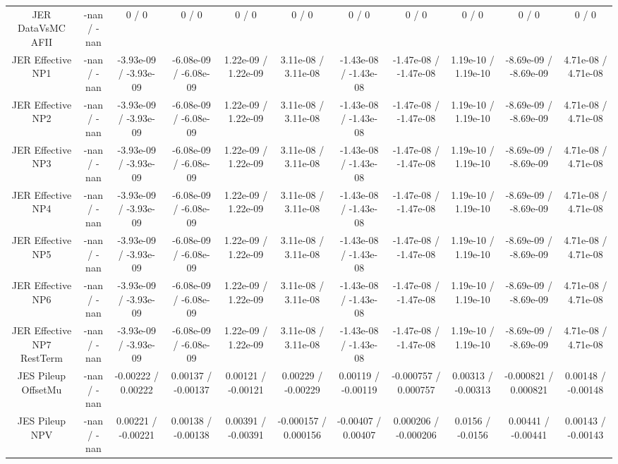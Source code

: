 \begin{table}[htbp]
\begin{center}
\begin{tabular}{|c|c|c|c|c|c|c|c|c|c|c|}
  JER DataVsMC AFII & -nan / -nan & 0 / 0 & 0 / 0 & 0 / 0 & 0 / 0 & 0 / 0 & 0 / 0 & 0 / 0 & 0 / 0 & 0 / 0 \\ 
  JER Effective NP1 & -nan / -nan & -3.93e-09 / -3.93e-09 & -6.08e-09 / -6.08e-09 & 1.22e-09 / 1.22e-09 & 3.11e-08 / 3.11e-08 & -1.43e-08 / -1.43e-08 & -1.47e-08 / -1.47e-08 & 1.19e-10 / 1.19e-10 & -8.69e-09 / -8.69e-09 & 4.71e-08 / 4.71e-08 \\ 
  JER Effective NP2 & -nan / -nan & -3.93e-09 / -3.93e-09 & -6.08e-09 / -6.08e-09 & 1.22e-09 / 1.22e-09 & 3.11e-08 / 3.11e-08 & -1.43e-08 / -1.43e-08 & -1.47e-08 / -1.47e-08 & 1.19e-10 / 1.19e-10 & -8.69e-09 / -8.69e-09 & 4.71e-08 / 4.71e-08 \\ 
  JER Effective NP3 & -nan / -nan & -3.93e-09 / -3.93e-09 & -6.08e-09 / -6.08e-09 & 1.22e-09 / 1.22e-09 & 3.11e-08 / 3.11e-08 & -1.43e-08 / -1.43e-08 & -1.47e-08 / -1.47e-08 & 1.19e-10 / 1.19e-10 & -8.69e-09 / -8.69e-09 & 4.71e-08 / 4.71e-08 \\ 
  JER Effective NP4 & -nan / -nan & -3.93e-09 / -3.93e-09 & -6.08e-09 / -6.08e-09 & 1.22e-09 / 1.22e-09 & 3.11e-08 / 3.11e-08 & -1.43e-08 / -1.43e-08 & -1.47e-08 / -1.47e-08 & 1.19e-10 / 1.19e-10 & -8.69e-09 / -8.69e-09 & 4.71e-08 / 4.71e-08 \\ 
  JER Effective NP5 & -nan / -nan & -3.93e-09 / -3.93e-09 & -6.08e-09 / -6.08e-09 & 1.22e-09 / 1.22e-09 & 3.11e-08 / 3.11e-08 & -1.43e-08 / -1.43e-08 & -1.47e-08 / -1.47e-08 & 1.19e-10 / 1.19e-10 & -8.69e-09 / -8.69e-09 & 4.71e-08 / 4.71e-08 \\ 
  JER Effective NP6 & -nan / -nan & -3.93e-09 / -3.93e-09 & -6.08e-09 / -6.08e-09 & 1.22e-09 / 1.22e-09 & 3.11e-08 / 3.11e-08 & -1.43e-08 / -1.43e-08 & -1.47e-08 / -1.47e-08 & 1.19e-10 / 1.19e-10 & -8.69e-09 / -8.69e-09 & 4.71e-08 / 4.71e-08 \\ 
  JER Effective NP7 RestTerm & -nan / -nan & -3.93e-09 / -3.93e-09 & -6.08e-09 / -6.08e-09 & 1.22e-09 / 1.22e-09 & 3.11e-08 / 3.11e-08 & -1.43e-08 / -1.43e-08 & -1.47e-08 / -1.47e-08 & 1.19e-10 / 1.19e-10 & -8.69e-09 / -8.69e-09 & 4.71e-08 / 4.71e-08 \\ 
  JES Pileup OffsetMu & -nan / -nan & -0.00222 / 0.00222 & 0.00137 / -0.00137 & 0.00121 / -0.00121 & 0.00229 / -0.00229 & 0.00119 / -0.00119 & -0.000757 / 0.000757 & 0.00313 / -0.00313 & -0.000821 / 0.000821 & 0.00148 / -0.00148 \\ 
  JES Pileup NPV & -nan / -nan & 0.00221 / -0.00221 & 0.00138 / -0.00138 & 0.00391 / -0.00391 & -0.000157 / 0.000156 & -0.00407 / 0.00407 & 0.000206 / -0.000206 & 0.0156 / -0.0156 & 0.00441 / -0.00441 & 0.00143 / -0.00143 \\ 

\end{tabular}
\end{center}
\end{table}
